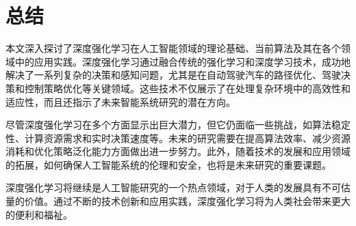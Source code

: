 \section{总结}\label{sec:conclusion}

本文深入探讨了深度强化学习在人工智能领域的理论基础、当前算法及其在各个领域中的应用实践。深度强化学习通过融合传统的强化学习和深度学习技术，成功地解决了一系列复杂的决策和感知问题，尤其是在自动驾驶汽车的路径优化、驾驶决策和控制策略优化等关键领域。这些技术不仅展示了在处理复杂环境中的高效性和适应性，而且还指示了未来智能系统研究的潜在方向。

尽管深度强化学习在多个方面显示出巨大潜力，但它仍面临一些挑战，如算法稳定性、计算资源需求和实时决策速度等。未来的研究需要在提高算法效率、减少资源消耗和优化策略泛化能力方面做出进一步努力。此外，随着技术的发展和应用领域的拓展，如何确保人工智能系统的伦理和安全，也将是未来研究的重要课题。

深度强化学习将继续是人工智能研究的一个热点领域，对于人类的发展具有不可估量的价值。通过不断的技术创新和应用实践，深度强化学习将为人类社会带来更大的便利和福祉。

\nocite{*}
